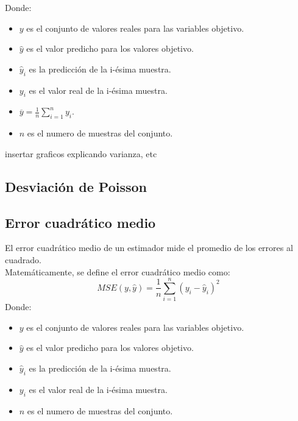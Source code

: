 Donde:
\begin{itemize}
	\item $y$ es el conjunto de valores reales para las variables objetivo.
	\item $\hat{y}$ es el valor predicho para los valores objetivo.
	\item $\hat{y}_i$ es la predicción de la  i-ésima muestra.
	\item $y_i$ es el valor real de la i-ésima muestra.
	\item $\overline{y} = \frac{1}{n} \sum_{i=1}^{n} y_i$.
	\item $n$ es el numero de muestras del conjunto.
\end{itemize}
insertar graficos explicando varianza,  etc
\subsection{Desviación de Poisson}
\subsection{Error cuadrático medio}
El error cuadrático medio de un estimador mide el promedio de los errores al cuadrado.  \\
Matemáticamente, se define el error cuadrático medio como:
\[
	MSE(y,\hat{y}) = \frac{1}{n} \sum_{i=1}^{n} (y_i - \hat{y}_i) ^2
\]
Donde:
\begin{itemize}
	\item $y$ es el conjunto de valores reales para las variables objetivo.
	\item $\hat{y}$ es el valor predicho para los valores objetivo.
	\item $\hat{y}_i$ es la predicción de la  i-ésima muestra.
	\item $y_i$ es el valor real de la i-ésima muestra.
	\item $n$ es el numero de muestras del conjunto.
\end{itemize}
